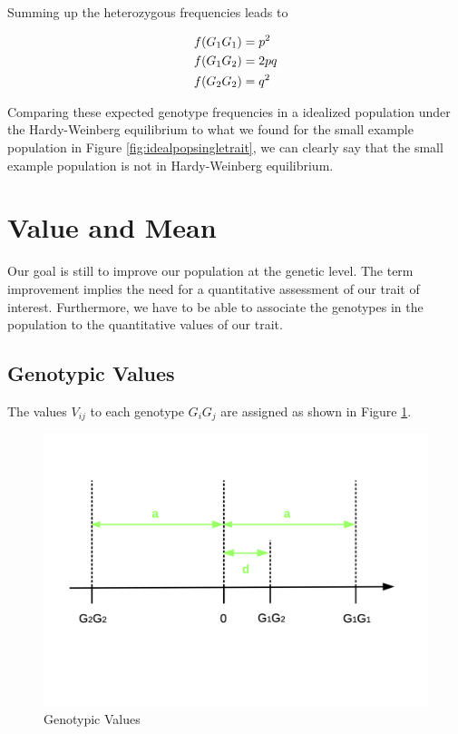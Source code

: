 \documentclass[
]{book}
\theoremstyle{definition}
\theoremstyle{definition}
\theoremstyle{definition}
\theoremstyle{remark}
\begin{document}
Summing up the heterozygous frequencies leads to

\begin{align}
f(G_1G_1) &= p^2 \notag \\
f(G_1G_2) &= 2pq \notag \\
f(G_2G_2) &= q^2
\label{eq:genofreq}
\end{align}

Comparing these expected genotype frequencies in a idealized population under the Hardy-Weinberg equilibrium to what we found for the small example population in Figure \ref{fig:idealpopsingletrait}, we can clearly say that the small example population is not in Hardy-Weinberg equilibrium.

\hypertarget{value-mean}{%
\section{Value and Mean}\label{value-mean}}

Our goal is still to improve our population at the genetic level. The term improvement implies the need for a quantitative assessment of our trait of interest. Furthermore, we have to be able to associate the genotypes in the population to the quantitative values of our trait.

\hypertarget{geno-value}{%
\subsection{Genotypic Values}\label{geno-value}}

The values \(V_{ij}\) to each genotype \(G_iG_j\) are assigned as shown in Figure \ref{fig:genotypicvalue}.

\begin{figure}
\includegraphics[width=24.19in]{odg/genotypicvalue} \caption{Genotypic Values}\label{fig:genotypicvalue}
\end{figure}
\end{document}
